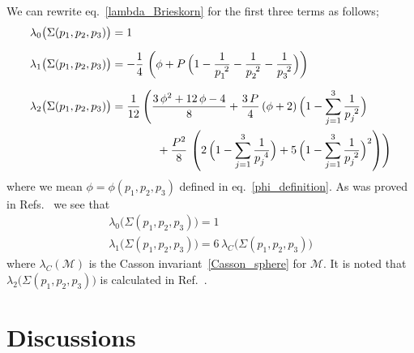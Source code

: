 \documentclass[12pt,reqno]{amsart}
\numberwithin{equation}{section}
\begin{document}
We can rewrite eq.~\eqref{lambda_Brieskorn} for the first three terms
as follows;
\begin{align}
  \lambda_0 \bigl( \Sigma(p_1, p_2, p_3) \bigr)
  & = 1
  \\[2mm]
%
  \lambda_1 \bigl( \Sigma(p_1, p_2, p_3) \bigr)
  & =
  -\frac{1}{4} \,
  \left(
    \phi + P \,
    \Bigl(
      1-\frac{1}{p_1^{~2}}-\frac{1}{p_2^{~2}}-\frac{1}{p_3^{~2}}
    \Bigr)
  \right)
  \\[2mm]
%
  \lambda_2 \bigl( \Sigma(p_1, p_2, p_3) \bigr)
  & =
  \frac{1}{12} \,\Biggl(
    \frac{3 \, \phi^2 + 12 \, \phi -4}{8}
    +
    \frac{3 \, P}{4} \, (\phi +2) \,
    \Bigl(
      1- \sum_{j=1}^3 \frac{1}{p_j^{~2}}
    \Bigr)
    \nonumber 
    \\
    & \qquad \qquad 
    +
    \frac{P^2}{8} \,
    \left(
      2 \, \Bigl( 1- \sum_{j=1}^3 \frac{1}{p_j^{~4}} \Bigr)
      +
      5 \, \Bigl( 1- \sum_{j=1}^3 \frac{1}{p_j^{~2}} \Bigr)^2
    \right)
  \Biggr)
\end{align}
where we mean $\phi=\phi(p_1, p_2, p_3)$ defined in eq.~\eqref{phi_definition}.
As was proved  in Refs.~ we see that
\begin{gather}
  \lambda_0
  \bigl( \Sigma(p_1, p_2, p_3) \bigr)
  =
  1
  \\[2mm]
%
  \lambda_1
  \bigl( \Sigma(p_1, p_2, p_3) \bigr)
  =
  6 \,
  \lambda_C  \bigl( \Sigma(p_1, p_2, p_3) \bigr)
\end{gather}
where
$\lambda_C(\mathcal{M})$ is the Casson invariant~\eqref{Casson_sphere}
for $\mathcal{M}$.
It is noted that
$\lambda_2\bigl(\Sigma(p_1,p_2,p_3)\bigr)$
is calculated  in Ref.~.










\section{Discussions}
\end{document}
